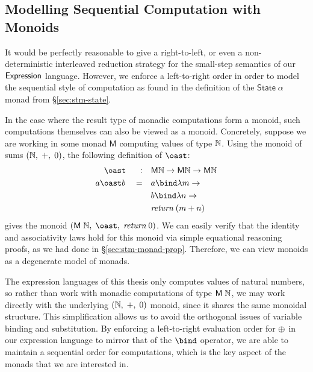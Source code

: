 
\subsection{Modelling Sequential Computation with Monoids}\label{sec:semantics-degenerate}%

It would be perfectly reasonable to give a right-to-left, or even
a non-deterministic interleaved reduction strategy for the small-step
semantics of our $\textsf{Expression}$ language. However, we enforce a left-to-right
order in order to model the sequential style of computation as found in the
definition of the $\mathsf{State}\;\alpha$ monad from \S\ref{sec:stm-state}.

In the case where the result type of monadic computations form a monoid,
such computations themselves can also be viewed as a monoid. Concretely,
suppose we are working in some monad $\mathsf{M}$ computing values of type
$\mathbb{N}$. Using the monoid of sums $(\mathbb{N},\;+,\;0)$, the following definition
of $\oast$:
\begin{align*}
	\phantom{a} \oast \phantom{b} \quad:\quad
		&\mathsf{M} \Nat \rightarrow \mathsf{M} \Nat \rightarrow \mathsf{M} \Nat \\
	a \oast b \quad=\quad 
		&a \bind \lambda m \rightarrow \\
		&b \bind \lambda n \rightarrow \\
		&\textit{return}\;(m + n)
\end{align*}
gives the monoid $(\mathsf{M}\;\Nat,\;\oast,\;\textit{return}\;0)$. We can
easily verify that the identity and associativity laws hold for this monoid
via simple equational reasoning proofs, as we had done in
\S\ref{sec:stm-monad-prop}. Therefore, we can view monoids as a degenerate
model of monads.

The expression languages of this thesis only computes values of natural
numbers, so rather than work with monadic computations of type
$\mathsf{M}\;\mathbb{N}$, we may work directly with the underlying
$(\mathbb{N},\;{+},\;0)$ monoid, since it shares the same monoidal structure. This
simplification allows us to avoid the orthogonal issues of variable binding
and substitution. By enforcing a left-to-right evaluation order for $\oplus$
in our expression language to mirror that of the $\bind$ operator, we
are able to maintain a sequential order for computations, which is the key
aspect of the monads that we are interested in.


